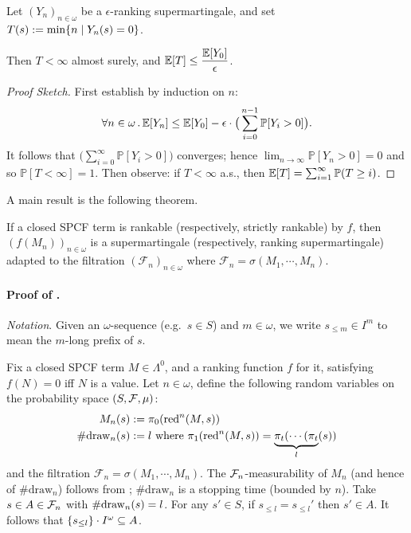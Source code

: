 \begin{theorem}
\label{thm:rank-PAST}
Let $(Y_n)_{n \in \omega}$ be a $\epsilon$-ranking supermartingale, and set $T(s) := \min \{n \mid Y_n(s) = 0\}$. 

Then $T < \infty$ almost surely, and $\mathbb{E}[T] \leq \dfrac{\mathbb{E}[Y_0]}{\epsilon}$.
\end{theorem}

\begin{proof}[Proof Sketch]
First establish by induction on $n$: 
\[
\forall n \in \omega \, . \, \mathbb{E}[Y_n] \leq \mathbb{E}[Y_0] - \epsilon \cdot \big(\sum_{i=0}^{n-1} \mathbb{P}[Y_i > 0]\big).
\]
It follows that $(\sum_{i=0}^{\infty} \mathbb{P}[Y_i > 0]\big)$ converges; hence $\lim_{n \to \infty} \mathbb{P}[Y_n > 0] = 0$ and so $\mathbb{P}[T < \infty] = 1$.
Then observe: if $T < \infty$ a.s., then $\mathbb{E}[T] = \sum^\infty_{i=1} \mathbb{P}(T \geq i)$.
\end{proof}

\medskip

A main result is the following theorem.
\begin{theorem} 
\label{thm:rankable and strict rankable}
If a closed SPCF term is rankable (respectively, strictly rankable) by $f$, then $(f(M_n))_{n \in \omega}$ is a 
supermartingale (respectively, ranking supermartingale) adapted to the filtration $(\mathcal{F}_n)_{n \in \omega}$ where $\mathcal{F}_n = \sigma(M_1, \cdots, M_n)$.
\end{theorem}


\paragraph{Proof of .}
\emph{Notation}. Given an $\omega$-sequence (e.g.~$s \in S$) and $m \in \omega$, we write $s_{\leq m} \in I^m$ to mean the $m$-long prefix of $s$.

Fix a closed SPCF term $M \in \Lambda^0$, and a ranking function $f$ for it, satisfying $f(N) = 0$ iff $N$ is a value.
Let $n \in \omega$, define the following random variables on the probability space $(S, \mathcal{F}, \mu)$:
\begin{align*}
M_n(s) &:= \pi_0 (\operatorname{red}^n(M, s))\\
\#\mathrm{draw}_{n}(s) &:= l \textrm{ where $\pi_1 (\operatorname{red}^n(M, s)) = \underbrace{\pi_t( \cdots (\pi_t}_l(s))$}
\end{align*}
and the filtration $\mathcal{F}_n = \sigma(M_1, \cdots, M_n)$.
The $\mathcal{F}_n$-measurability of $M_n$ (and hence of $\#\mathrm{draw}_n$) follows from \citep{DBLP:conf/icfp/BorgstromLGS16};
$\#\mathrm{draw}_n$ is a stopping time (bounded by $n$).
Take $s \in A \in \mathcal{F}_n$ with $\#\mathrm{draw}_{n}(s) = l$.
For any $s'\in S$, if $s_{\leq l} = s_{\leq l}'$ then $s' \in A$.
It follows that ${\{s_{\leq l}\} \cdot I^\omega} \subseteq A$.

